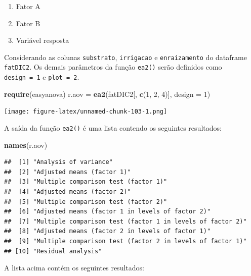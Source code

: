 \documentclass[
]{article}
\newenvironment{Shaded}{\begin{snugshade}}{\end{snugshade}}
\newcommand{\DataTypeTok}[1]{\textcolor[rgb]{0.13,0.29,0.53}{#1}}
\newcommand{\DecValTok}[1]{\textcolor[rgb]{0.00,0.00,0.81}{#1}}
\newcommand{\KeywordTok}[1]{\textcolor[rgb]{0.13,0.29,0.53}{\textbf{#1}}}
\newcommand{\NormalTok}[1]{#1}
\newcommand{\StringTok}[1]{\textcolor[rgb]{0.31,0.60,0.02}{#1}}
\providecommand{\tightlist}{%
  \setlength{\itemsep}{0pt}\setlength{\parskip}{0pt}}
\begin{document}
\begin{enumerate}
\def\labelenumi{\arabic{enumi}.}
\tightlist
\item
  Fator A
\item
  Fator B
\item
  Variável resposta
\end{enumerate}

Considerando as colunas \texttt{substrato}, \texttt{irrigacao} e \texttt{enraizamento} do dataframe \texttt{fatDIC2}. Os demais parâmetros da função \texttt{ea2()} serão definidos como \texttt{design\ =\ 1} e \texttt{plot\ =\ 2}.

\begin{Shaded}
\begin{Highlighting}[]
\KeywordTok{require}\NormalTok{(easyanova)}
\NormalTok{r.aov =}\StringTok{ }\KeywordTok{ea2}\NormalTok{(fatDIC2[, }\KeywordTok{c}\NormalTok{(}\DecValTok{1}\NormalTok{, }\DecValTok{2}\NormalTok{, }\DecValTok{4}\NormalTok{)], }\DataTypeTok{design =} \DecValTok{1}\NormalTok{)}
\end{Highlighting}
\end{Shaded}

\texttt{[image: figure-latex/unnamed-chunk-103-1.png]}

A saída da função \texttt{ea2()} é uma lista contendo os seguintes resultados:

\begin{Shaded}
\begin{Highlighting}[]
\KeywordTok{names}\NormalTok{(r.aov)}
\end{Highlighting}
\end{Shaded}

\begin{verbatim}
##  [1] "Analysis of variance"                                     
##  [2] "Adjusted means (factor 1)"                                
##  [3] "Multiple comparison test (factor 1)"                      
##  [4] "Adjusted means (factor 2)"                                
##  [5] "Multiple comparison test (factor 2)"                      
##  [6] "Adjusted means (factor 1 in levels of factor 2)"          
##  [7] "Multiple comparison test (factor 1 in levels of factor 2)"
##  [8] "Adjusted means (factor 2 in levels of factor 1)"          
##  [9] "Multiple comparison test (factor 2 in levels of factor 1)"
## [10] "Residual analysis"
\end{verbatim}

A lista acima contém os seguintes resultados:
\end{document}

